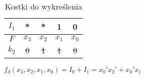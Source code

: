 \begin{table}[H]
    \centering
    \begin{tabular}[t]{ |c|c c c c|}
        \hline
        $I_1$ & * & * & 1 & 0 \\
        \hline\hline
        $F$ & $x_3$ & $x_2$ & $x_1$ & $x_0$ \\
        \hline
        \sout{$k_2$} & \sout{0} & \sout{1} & \sout{1} & \sout{0} \\
        \hline
    \end{tabular}
    \caption{Kostki do wykreślenia}\label{tab:die-1e}
\end{table}

$f_d(x_3, x_2, x_1, x_0) = I_0 + I_1 = x_0'x_2' + x_0'x_1$